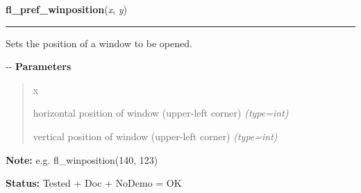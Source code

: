 \hspace{.8\funcindent}\begin{boxedminipage}{\funcwidth}

    \raggedright \textbf{fl\_pref\_winposition}(\textit{x}, \textit{y})

    \vspace{-1.5ex}

    \rule{\textwidth}{0.5\fboxrule}
\setlength{\parskip}{2ex}

Sets the position of a window to be opened.

-{}-
\setlength{\parskip}{1ex}
      \textbf{Parameters}
      \vspace{-1ex}

      \begin{quote}
        \begin{Ventry}{x}

          \item[x]


horizontal position of window (upper-left corner)
            {\it (type=int)}

          \item[y]


vertical position of window (upper-left corner)
            {\it (type=int)}

        \end{Ventry}

      \end{quote}

\textbf{Note:} 
e.g. fl\_winposition(140, 123)


\textbf{Status:} 
Tested + Doc + NoDemo = OK


    \end{boxedminipage}

    \label{xformslib:flxbasic:fl_winminsize}

    \vspace{0.5ex}

